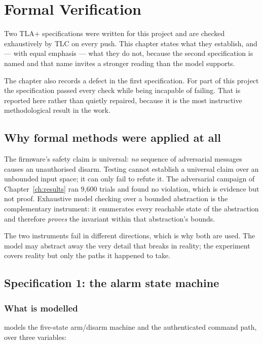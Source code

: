 \chapter{Formal Verification}\label{ch:formal}

Two TLA+ specifications were written for this project and are checked exhaustively by TLC on
every push. This chapter states what they establish, and — with equal emphasis — what they do
not, because the second specification is named  and that name invites a stronger
reading than the model supports.

The chapter also records a defect in the first specification. For part of this project the
specification passed every check while being incapable of failing. That is reported here rather
than quietly repaired, because it is the most instructive methodological result in the work.

\section{Why formal methods were applied at all}

The firmware's safety claim is universal: \emph{no} sequence of adversarial messages causes an
unauthorised disarm. Testing cannot establish a universal claim over an unbounded input space;
it can only fail to refute it. The adversarial campaign of Chapter~\ref{ch:results} ran 9,600
trials and found no violation, which is evidence but not proof. Exhaustive model checking over
a bounded abstraction is the complementary instrument: it enumerates every reachable state of
the abstraction and therefore \emph{proves} the invariant within that abstraction's bounds.

The two instruments fail in different directions, which is why both are used. The model may
abstract away the very detail that breaks in reality; the experiment covers reality but only
the paths it happened to take.

\section{Specification 1: the alarm state machine}

\subsection{What is modelled}

 models the five-state arm/disarm machine and the authenticated
command path, over three variables:

